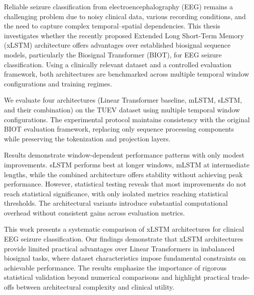 
\cleardoubleoddpage%
\begin{abstract*}
Reliable seizure classification from electroencephalography (EEG) remains a challenging problem due to noisy clinical data, various recording conditions, and the need to capture complex temporal–spatial dependencies. This thesis investigates whether the recently proposed Extended Long Short-Term Memory (xLSTM) architecture offers advantages over established biosignal sequence models, particularly the Biosignal Transformer (BIOT), for EEG seizure classification. Using a clinically relevant dataset and a controlled evaluation framework, both architectures are benchmarked across multiple temporal window configurations and training regimes.

We evaluate four architectures (Linear Transformer baseline, \ac{mLSTM}, \ac{sLSTM}, and their combination) on the \ac{TUEV} dataset using multiple temporal window configurations. The experimental protocol maintains consistency with the original \ac{BIOT} evaluation framework, replacing only sequence processing components while preserving the tokenization and projection layers.

Results demonstrate window-dependent performance patterns with only modest improvements. \ac{sLSTM} performs best at longer windows, \ac{mLSTM} at intermediate lengths, while the combined architecture offers stability without achieving peak performance. However, statistical testing reveals that most improvements do not reach statistical significance, with only isolated metrics reaching statistical thresholds. The architectural variants introduce substantial computational overhead without consistent gains across evaluation metrics.

This work presents a systematic comparison of \ac{xLSTM} architectures for clinical \ac{EEG} seizure classification. Our findings demonstrate that \ac{xLSTM} architectures provide limited practical advantages over Linear Transformers in imbalanced biosignal tasks, where dataset characteristics impose fundamental constraints on achievable performance. The results emphasize the importance of rigorous statistical validation beyond numerical comparisons and highlight practical trade-offs between architectural complexity and clinical utility.
\end{abstract*}

